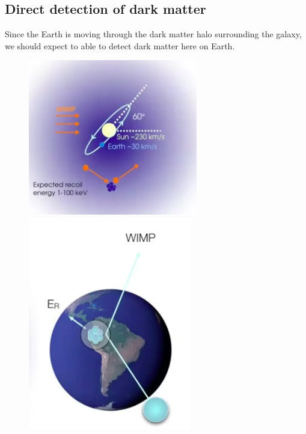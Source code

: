\minirule

\subsection{Direct detection of dark matter}
Since the Earth is moving through the dark matter halo surrounding the galaxy, we should expect to able to detect dark matter here on Earth. 

\begin{figure}[H]
\centering
\includegraphics[scale=0.45]{darkmatter1.png}\qquad\qquad\qquad
\includegraphics[scale=0.4]{darkmatter2.png}
\end{figure}

